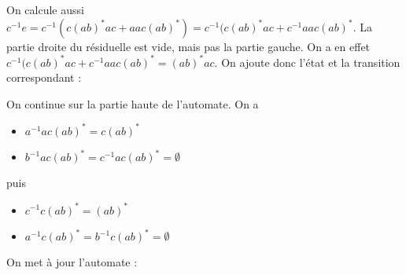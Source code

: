 \begin{example}
On calcule aussi $c^{-1}e = c^{-1}(c(ab)^*ac + aac(ab)^*) = c^{-1}(c(ab)^*ac + c^{-1}aac(ab)^*$. La partie droite du résiduelle est vide, mais pas la partie gauche. On a en effet $c^{-1}(c(ab)^*ac + c^{-1}aac(ab)^* = (ab)^*ac$. On ajoute donc l'état et la transition correspondant :



\begin{figure}[H]
\centering

\end{figure}

On continue sur la partie haute de l'automate. On a 

\begin{itemize}
\item $a^{-1}ac(ab)^* = c(ab)^*$
\item $b^{-1}ac(ab)^* = c^{-1}ac(ab)^* = \emptyset$
\end{itemize}

puis

\begin{itemize}
\item $c^{-1}c(ab)^* = (ab)^*$
\item $a^{-1}c(ab)^* = b^{-1}c(ab)^* = \emptyset$
\end{itemize}

On met à jour l'automate : 


\begin{figure}[H]
\centering


\end{figure}
\end{example}
